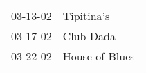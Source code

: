 \begin{supertabular}{p{0.25\columnwidth}p{0.75\columnwidth}}
 03-13-02 &      Tipitina's \\
 03-17-02 &       Club Dada \\
 03-22-02 &  House of Blues \\
\end{supertabular}

